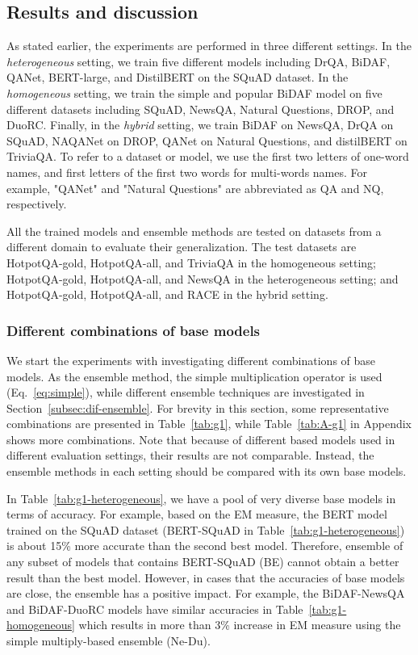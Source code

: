 \documentclass[review]{elsarticle}
\begin{document}
\subsection{Results and discussion}
As stated earlier, the experiments are performed in three different settings. In the \textit{heterogeneous} setting, we train five different models including DrQA, BiDAF, QANet, BERT-large, and DistilBERT on the SQuAD dataset.
In the \textit{homogeneous} setting, we train the simple and popular BiDAF model on five different datasets including SQuAD, NewsQA, Natural Questions, DROP, and DuoRC. Finally, in the \textit{hybrid} setting, we train  BiDAF on NewsQA, DrQA on SQuAD, NAQANet on DROP, QANet on Natural Questions, and distilBERT on TriviaQA. To refer to a dataset or model, we use the first two letters of one-word names, and first letters of the first two words for multi-words names. For example, "QANet" and "Natural Questions" are abbreviated as QA and NQ, respectively. 

All the trained models and ensemble methods are tested on datasets from a different domain to evaluate their generalization. The test datasets are HotpotQA-gold, HotpotQA-all, and TriviaQA in the homogeneous setting; HotpotQA-gold, HotpotQA-all, and NewsQA in the heterogeneous setting; and HotpotQA-gold, HotpotQA-all, and RACE in the hybrid setting.

\subsubsection{Different combinations of base models}
We start the experiments with investigating different combinations of base models. As the ensemble method, the simple multiplication operator is used (Eq.~\ref{eq:simple}), while different ensemble techniques are investigated in Section~\ref{subsec:dif-ensemble}. For brevity in this section, some representative combinations are presented in Table~\ref{tab:g1}, while Table~\ref{tab:A-g1} in Appendix shows more combinations.
Note that because of different based models used in different evaluation settings, their results are not comparable. Instead, the ensemble methods in each setting should be compared with its own base models. 

In Table~\ref{tab:g1-heterogeneous}, we have a pool of very diverse base models in terms of accuracy. For example, based on the EM measure, the BERT model trained on the SQuAD dataset (BERT-SQuAD in Table~\ref{tab:g1-heterogeneous}) is about 15\% more accurate than the second best model. Therefore, ensemble of any subset of models that contains BERT-SQuAD (BE) cannot obtain a better result than the best model. However, in cases that the accuracies of base models are close, the ensemble has a positive impact. For example, the BiDAF-NewsQA and BiDAF-DuoRC models have similar accuracies in Table~\ref{tab:g1-homogeneous} which results in more than 3\% increase in EM measure  using the simple multiply-based ensemble (Ne-Du). %
\end{document}
